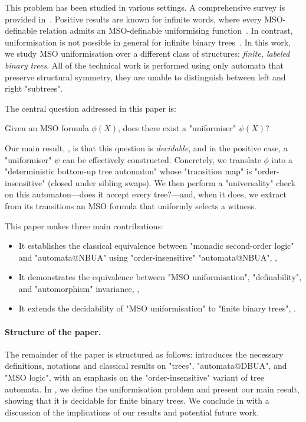 \documentclass[a4paper,UKenglish,cleveref, autoref, thm-restate]{lipics-v2021}
\begin{document}
This problem has been studied in various settings. A comprehensive survey is provided in~\cite{Cara15}. Positive results are known for infinite words, where every MSO-definable
relation admits an MSO-definable uniformising function~\cite{Siefkes1975, Choffrut1999, Rabin07}. In contrast, uniformisation is not possible in general for infinite binary
trees~\cite{GS83}.
In this work, we study MSO uniformisation over a different class of structures: \emph{finite, labeled binary trees}.
All of the technical work is performed using only automata that preserve structural symmetry,
\ie they are unable to distinguish between left and right "subtrees".

The central question addressed in this paper is:

\begin{problem}\label{prob:uniformisation-problem}
\AP Given an MSO formula $\phi(X)$, does there exist a "uniformiser" $\psi(X)$?
\end{problem}

Our main result, , is that this question is \emph{decidable}, and in the positive case, a "uniformiser" $\psi$ can be effectively constructed. Concretely, we translate $\phi$ into a
"deterministic bottom-up tree automaton" whose "transition map" is "order-insensitive" (\ie closed under sibling swaps). We then perform a "universality" check on this
automaton—does it accept every tree?—and, when it does, we extract from its transitions an MSO formula that uniformly selects a witness.

This paper makes three main contributions:
\begin{itemize}
	\item It establishes the classical equivalence between "monadic second-order logic" and "automata@NBUA" using "order-insensitive" "automata@NBUA", ,
	\item It demonstrates the equivalence between "MSO uniformisation", "definability", and "automorphism" invariance, ,
	\item It extends the decidability of "MSO uniformisation" to "finite binary trees", .
\end{itemize}


\paragraph*{Structure of the paper.} The remainder of the paper is structured as follows:
 introduces the necessary definitions, notations and classical results on "trees", "automata@DBUA", and "MSO logic", with an emphasis on the "order-insensitive"
variant of tree automata.
In , we define the uniformisation problem and present our main result, showing that it is decidable for finite binary trees.
We conclude in  with a discussion of the implications of our results and potential future work.
\end{document}
